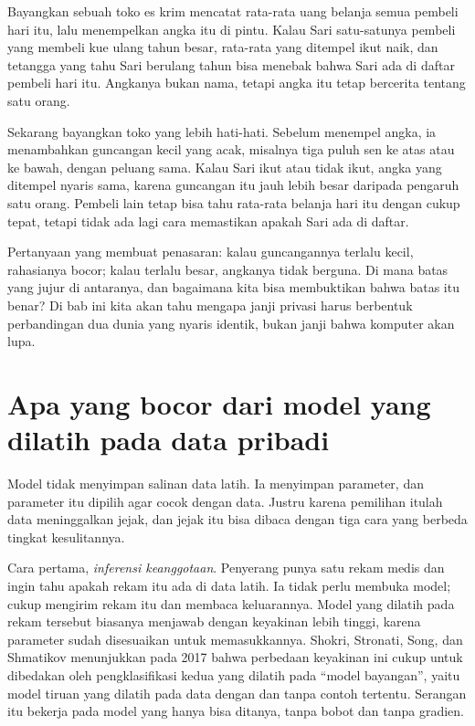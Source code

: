 \begin{untukanak}
Bayangkan sebuah toko es krim mencatat rata-rata uang belanja semua pembeli hari itu,
lalu menempelkan angka itu di pintu. Kalau Sari satu-satunya pembeli yang membeli kue
ulang tahun besar, rata-rata yang ditempel ikut naik, dan tetangga yang tahu Sari
berulang tahun bisa menebak bahwa Sari ada di daftar pembeli hari itu. Angkanya bukan
nama, tetapi angka itu tetap bercerita tentang satu orang.

Sekarang bayangkan toko yang lebih hati-hati. Sebelum menempel angka, ia menambahkan
guncangan kecil yang acak, misalnya tiga puluh sen ke atas atau ke bawah, dengan
peluang sama. Kalau Sari ikut atau tidak ikut, angka yang ditempel nyaris sama, karena
guncangan itu jauh lebih besar daripada pengaruh satu orang. Pembeli lain tetap bisa
tahu rata-rata belanja hari itu dengan cukup tepat, tetapi tidak ada lagi cara
memastikan apakah Sari ada di daftar.

Pertanyaan yang membuat penasaran: kalau guncangannya terlalu kecil, rahasianya bocor;
kalau terlalu besar, angkanya tidak berguna. Di mana batas yang jujur di antaranya, dan
bagaimana kita bisa membuktikan bahwa batas itu benar? Di bab ini kita akan tahu
mengapa janji privasi harus berbentuk perbandingan dua dunia yang nyaris identik, bukan
janji bahwa komputer akan lupa.
\end{untukanak}

\section{Apa yang bocor dari model yang dilatih pada data pribadi}

Model tidak menyimpan salinan data latih. Ia menyimpan parameter, dan parameter itu
dipilih agar cocok dengan data. Justru karena pemilihan itulah data meninggalkan jejak,
dan jejak itu bisa dibaca dengan tiga cara yang berbeda tingkat kesulitannya.

Cara pertama, \emph{inferensi keanggotaan}. Penyerang punya satu rekam medis dan ingin
tahu apakah rekam itu ada di data latih. Ia tidak perlu membuka model; cukup mengirim
rekam itu dan membaca keluarannya. Model yang dilatih pada rekam tersebut biasanya
menjawab dengan keyakinan lebih tinggi, karena parameter sudah disesuaikan untuk
memasukkannya. Shokri, Stronati, Song, dan Shmatikov menunjukkan pada 2017 bahwa
perbedaan keyakinan ini cukup untuk dibedakan oleh pengklasifikasi kedua yang dilatih
pada ``model bayangan'', yaitu model tiruan yang dilatih pada data dengan dan tanpa
contoh tertentu. Serangan itu bekerja pada model yang hanya bisa ditanya, tanpa bobot
dan tanpa gradien.

